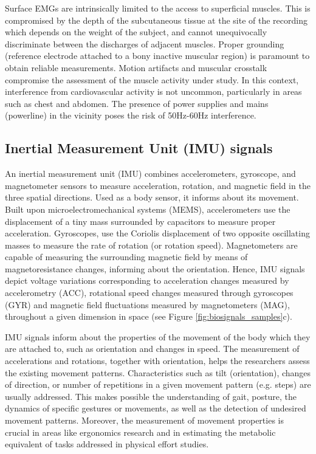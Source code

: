 Surface EMGs are intrinsically limited to the access to superficial muscles. This is compromised by the depth of the subcutaneous tissue at the site of the recording which depends on the weight of the subject, and cannot unequivocally discriminate between the discharges of adjacent muscles.
Proper grounding (reference electrode attached to a bony inactive muscular region) is paramount to obtain reliable measurements. Motion artifacts and muscular crosstalk compromise the assessment of the muscle activity under study. In this context, interference from cardiovascular activity is not uncommon, particularly in areas such as chest and abdomen. The presence of power supplies and mains (powerline) in the vicinity poses the risk of 50Hz-60Hz interference.

\subsection*{Inertial Measurement Unit (IMU) signals}
An inertial measurement unit (IMU) combines accelerometers, gyroscope, and magnetometer sensors to measure acceleration, rotation, and magnetic field in the three spatial directions. Used as a body sensor, it informs about its movement. Built upon microelectromechanical systems (MEMS), accelerometers use the displacement of a tiny mass surrounded by capacitors to measure proper acceleration. Gyroscopes, use the Coriolis displacement of two opposite oscillating masses to measure the rate of rotation (or rotation speed). Magnetometers are capable of measuring the surrounding magnetic field by means of magnetoresistance changes, informing about the orientation. Hence, IMU signals depict voltage variations corresponding to acceleration changes measured by accelerometry (ACC), rotational speed changes measured through gyroscopes (GYR) and magnetic field fluctuations measured by magnetometers (MAG), throughout a given dimension in space
(see Figure \ref{fig:biosignals_samples}c).

IMU signals inform about the properties of the movement of the body which they are attached to, such as orientation and changes in speed. The measurement of accelerations and rotations, together with orientation, helps the researchers assess the existing movement patterns. Characteristics such as tilt (orientation), changes of direction, or number of repetitions in a given movement pattern (e.g. steps) are usually addressed. This makes possible the understanding of gait, posture, the dynamics of specific gestures or movements, as well as the detection of undesired movement patterns. Moreover, the measurement of movement properties is crucial in areas like ergonomics research and in estimating the metabolic equivalent of tasks addressed in physical effort studies.

